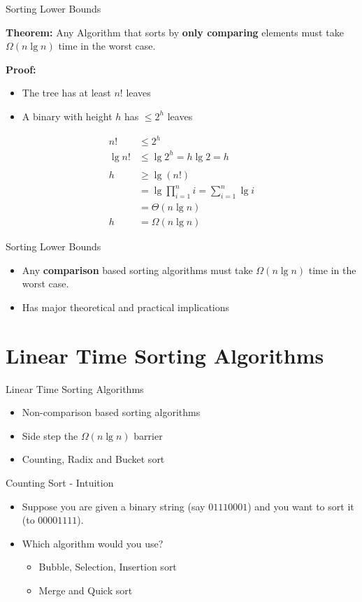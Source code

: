 \documentclass{beamer}
\begin{document}
\begin{frame}{Sorting Lower Bounds}

{\bf Theorem:} Any Algorithm that sorts by {\bf only comparing} elements must take $\Omega(n \lg n)$ time in the worst case.

{\bf Proof:} 
\begin{itemize}
\item The tree has at least $n!$ leaves 
\item A binary with height $h$ has $\leq 2^h$ leaves
\end{itemize}

\begin{align*}
n!  &\leq 2^h \\
\lg n! & \leq \lg 2^h = h \lg 2 = h\\
~ & ~ \\
h   &\geq \lg (n!) \\
    &= \lg \prod_{i=1}^{n} i = \sum_{i=1}^{n} \lg i \\
    &= \Theta(n \lg n)\\
h   &= \Omega(n \lg n)
\end{align*}
\end{frame}



\begin{frame}{Sorting Lower Bounds}
\begin{itemize}
\item Any {\bf comparison } based sorting algorithms must take $\Omega(n \lg n)$ time in the worst case. 
\item Has major theoretical and practical implications
\end{itemize}
\end{frame}


\section{Linear Time Sorting Algorithms}

\begin{frame}{Linear Time Sorting Algorithms}
\begin{itemize}
\item Non-comparison based sorting algorithms
\item Side step the $\Omega(n \lg n)$ barrier
\item Counting, Radix and Bucket sort
\end{itemize}
\end{frame}


\begin{frame}{Counting Sort - Intuition}
\begin{itemize}
\item Suppose you are given a binary string (say $01110001$) and you want to sort it (to $00001111$).
\item Which algorithm would you use?
\begin{itemize}
    \item Bubble, Selection, Insertion sort
    \item Merge and Quick sort
\end{itemize}
\end{itemize}
\end{frame}
\end{document}
